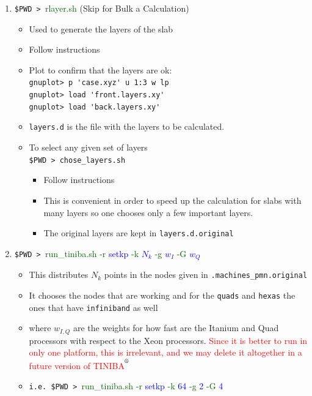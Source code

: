 \documentclass[openany,oneside]{book}
\def\reg{\textsuperscript{\textregistered}}
\numberwithin{equation}{section}
\begin{document}
\begin{enumerate}
\begin{itemize}
{This generates 64 $N_k$-points in the IBZ.
}
\end{itemize}
\item \verb=$PWD > =\textcolor{darkgreen}{rlayer.sh} (Skip for Bulk a Calculation)
\begin{itemize}
\item Used to generate the layers of the slab
\item Follow instructions
\item Plot to confirm that the layers are ok:\\
\verb=gnuplot> p 'case.xyz' u 1:3 w lp=\\
\verb=gnuplot> load 'front.layers.xy'=\\
\verb=gnuplot> load 'back.layers.xy'=
\item \verb=layers.d= is the file with the layers to be calculated.  
\item To select any given set of layers\\ 
\verb=$PWD > chose_layers.sh=
\begin{itemize}
\item Follow instructions
\item This is convenient in order to speed
 up the calculation for slabs with many
 layers so one chooses only a few important layers. 
\item The original layers are kept in \verb=layers.d.original=
\end{itemize}
\end{itemize}
\item \verb=$PWD > =\textcolor{darkgreen}{run\_tiniba.sh}
 \textcolor{darkgreen}{-r} \textcolor{blue}{setkp} 
 \textcolor{darkgreen}{-k} \textcolor{blue}{$N_k$} 
 \textcolor{darkgreen}{-g} \textcolor{blue}{$w_I$} 
 \textcolor{darkgreen}{-G} \textcolor{blue}{$w_Q$} 
\begin{itemize}
\item This distributes $N_k$ points in the nodes given in
  \verb=.machines_pmn.original=
\item It chooses the nodes that are working and for the \verb=quads=
  and \verb=hexas= the ones
  that have \verb=infiniband= as well
\item where $w_{I,Q}$ are the weights for how fast are the Itanium and Quad processors with respect to the Xeon processors.
\textcolor{red}{Since it is better to run in only one platform, this
  is irrelevant, and we may delete it altogether in a future version
  of TINIBA$^{\reg}$
}
\item
 \verb=i.e. $PWD > =\textcolor{darkgreen}{run\_tiniba.sh}
\textcolor{darkgreen}{-r} \textcolor{blue}{setkp} 
\textcolor{darkgreen}{-k} \textcolor{blue}{64} 
\textcolor{darkgreen}{-g} \textcolor{blue}{2} 
\textcolor{darkgreen}{-G} \textcolor{blue}{4} 


\end{itemize}
\end{enumerate}
\end{document}
